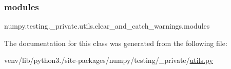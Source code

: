 \subsubsection{\texorpdfstring{modules}{modules}}
{\footnotesize\ttfamily numpy.\+testing.\+\_\+private.\+utils.\+clear\+\_\+and\+\_\+catch\+\_\+warnings.\+modules}



The documentation for this class was generated from the following file\+:\begin{DoxyCompactItemize}
\item 
venv/lib/python3./site-\/packages/numpy/testing/\+\_\+private/\hyperlink{numpy_2testing_2__private_2utils_8py}{utils.\+py}\end{DoxyCompactItemize}
